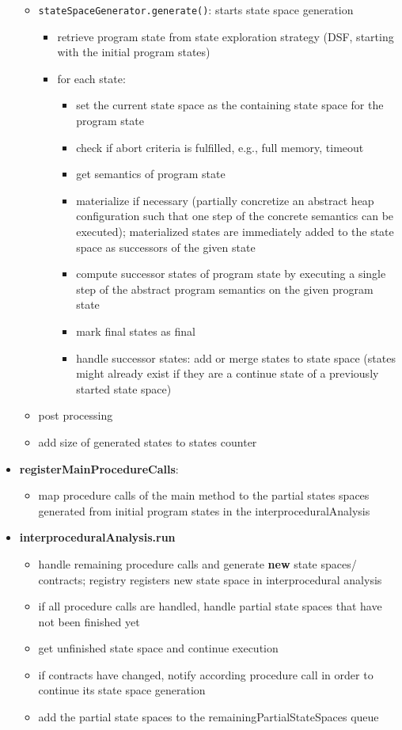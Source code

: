 \documentclass[a4paper,12pt]{article}
\begin{document}
\begin{itemize}
\begin{itemize}
		\item \texttt{stateSpaceGenerator.generate()}: starts state space generation
		\begin{itemize}
			\item retrieve program state from state exploration strategy (DSF, starting with the initial program states)
			\item for each state: 
			\begin{itemize}
				\item set the current state space as the containing state space for the program state
				\item check if abort criteria is fulfilled, e.g., full memory, timeout
				\item get semantics of program state
				\item materialize if necessary (partially concretize an abstract heap configuration such that one step of the concrete semantics can be executed); materialized states are immediately added to the state space as successors of the given state
				\item compute successor states of program state by executing a single step of the abstract program semantics on the given program state
				\item mark final states as final
				\item handle successor states: add or merge states to state space (states might already exist if they are a continue state of a previously started state space)
			\end{itemize}
		\end{itemize}	
		\item post processing
		\item add size of generated states to states counter
	\end{itemize}
	\item \textbf{registerMainProcedureCalls}:
	\begin{itemize}
		\item map procedure calls of the main method to the partial states spaces generated from initial program states in the interproceduralAnalysis
	\end{itemize}
	\item \textbf{interproceduralAnalysis.run}
	\begin{itemize}
		\item handle remaining procedure calls and generate \textbf{new} state spaces/ contracts; registry registers new state space in interprocedural analysis
		\item if all procedure calls are handled, handle partial state spaces that have not been finished yet
		\item get unfinished state space and continue execution
		\item if contracts have changed, notify according procedure call in order to continue its state space generation 
		\item add the partial state spaces to the remainingPartialStateSpaces queue
	\end{itemize}
\end{itemize}
\end{document}
